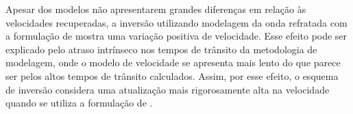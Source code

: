 Apesar dos modelos não apresentarem grandes diferenças em relação às velocidades recuperadas, a inversão utilizando modelagem da onda refratada com a formulação de  mostra uma variação positiva de velocidade. Esse efeito pode ser explicado pelo atraso intrínseco nos tempos de trânsito da metodologia de modelagem, onde o modelo de velocidade se apresenta mais lento do que parece ser pelos altos tempos de trânsito calculados. Assim, por esse efeito, o esquema de inversão considera uma atualização mais rigorosamente alta na velocidade quando se utiliza a formulação de .    

